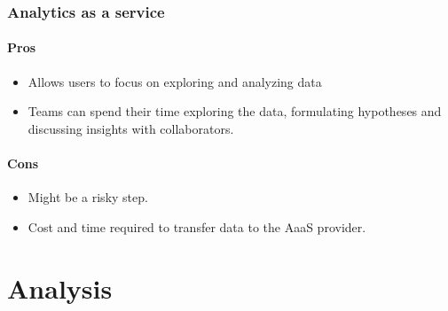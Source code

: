 \documentclass[a4paper,12pt]{report}
\begin{document}
    \subsection{Analytics as a service}
    \subsubsection{Pros}
    \begin{itemize}
      \item Allows users to focus on exploring and analyzing data      
      \item Teams can spend their time exploring the data, formulating hypotheses and discussing insights with collaborators.      
    \end{itemize}
    
    \subsubsection{Cons}
    \begin{itemize}
      \item Might be a risky step.
      \item Cost and time required to transfer data to the AaaS provider.      
    \end{itemize}

    \chapter {Analysis}
\end{document}
